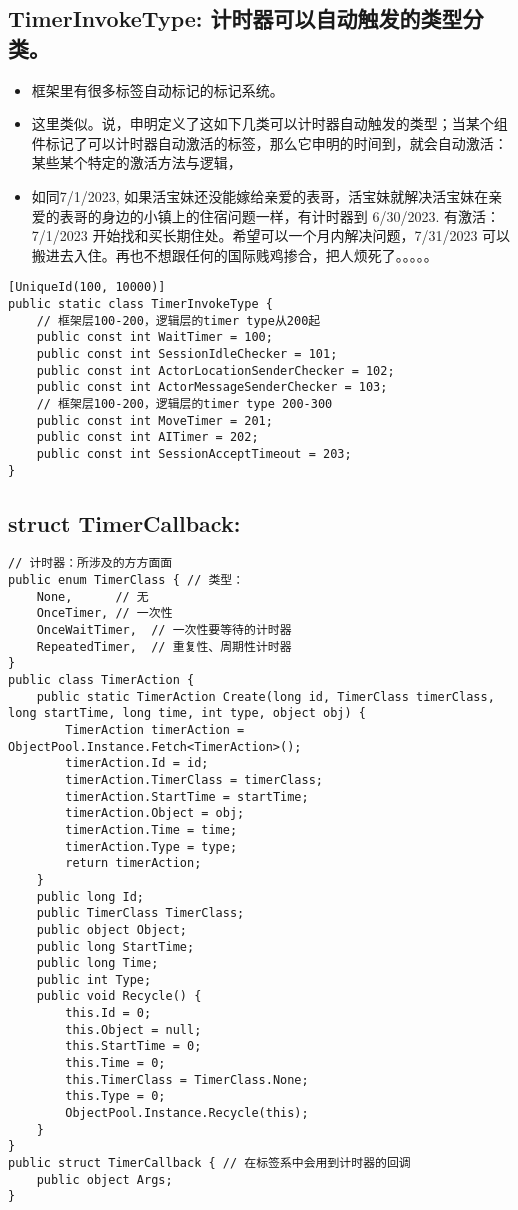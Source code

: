 \documentclass[9pt, b5paper]{article}
\begin{document}
\subsection{TimerInvokeType: 计时器可以自动触发的类型分类。}
\label{sec-1-18}
\begin{itemize}
\item 框架里有很多标签自动标记的标记系统。
\item 这里类似。说，申明定义了这如下几类可以计时器自动触发的类型；当某个组件标记了可以计时器自动激活的标签，那么它申明的时间到，就会自动激活：某些某个特定的激活方法与逻辑，
\item 如同7/1/2023, 如果活宝妹还没能嫁给亲爱的表哥，活宝妹就解决活宝妹在亲爱的表哥的身边的小镇上的住宿问题一样，有计时器到 6/30/2023. 有激活：7/1/2023 开始找和买长期住处。希望可以一个月内解决问题，7/31/2023 可以搬进去入住。再也不想跟任何的国际贱鸡掺合，把人烦死了。。。。。
\end{itemize}
\begin{verbatim}
[UniqueId(100, 10000)]
public static class TimerInvokeType {
    // 框架层100-200，逻辑层的timer type从200起
    public const int WaitTimer = 100;
    public const int SessionIdleChecker = 101;
    public const int ActorLocationSenderChecker = 102;
    public const int ActorMessageSenderChecker = 103;
    // 框架层100-200，逻辑层的timer type 200-300
    public const int MoveTimer = 201;
    public const int AITimer = 202;
    public const int SessionAcceptTimeout = 203;
}
\end{verbatim}
\subsection{struct TimerCallback:}
\label{sec-1-19}
\begin{verbatim}
// 计时器：所涉及的方方面面
public enum TimerClass { // 类型：
    None,      // 无
    OnceTimer, // 一次性
    OnceWaitTimer,  // 一次性要等待的计时器
    RepeatedTimer,  // 重复性、周期性计时器
}
public class TimerAction {
    public static TimerAction Create(long id, TimerClass timerClass, long startTime, long time, int type, object obj) {
        TimerAction timerAction = ObjectPool.Instance.Fetch<TimerAction>();
        timerAction.Id = id;
        timerAction.TimerClass = timerClass;
        timerAction.StartTime = startTime;
        timerAction.Object = obj;
        timerAction.Time = time;
        timerAction.Type = type;
        return timerAction;
    }
    public long Id;
    public TimerClass TimerClass;
    public object Object;
    public long StartTime;
    public long Time;
    public int Type;
    public void Recycle() {
        this.Id = 0;
        this.Object = null;
        this.StartTime = 0;
        this.Time = 0;
        this.TimerClass = TimerClass.None;
        this.Type = 0;
        ObjectPool.Instance.Recycle(this);
    }
}
public struct TimerCallback { // 在标签系中会用到计时器的回调
    public object Args;
}
\end{verbatim}
\end{document}
